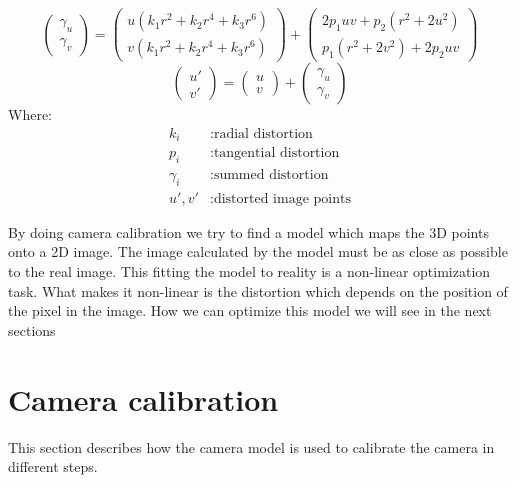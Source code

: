 \documentclass[11pt,a4paper,titlepage,oneside]{report}
\begin{document}
\begin{equation}\label{eq:dist}
	\begin{pmatrix}\gamma_{u} \\
	  \gamma_{v}
	\end{pmatrix}=\begin{pmatrix}
	  u(k_1r^2+k_2r^4+k_3r^6)\\
	  v(k_1r^2+k_2r^4+k_3r^6)
	\end{pmatrix}+\begin{pmatrix}
	  2p_1uv+p_2(r^2+2u^2)\\
	  p_1(r^2+2v^2)+2p_2uv
	\end{pmatrix}
\end{equation}
\begin{equation}\label{eq:pdist}
\begin{pmatrix}u'\\v'\end{pmatrix}=\begin{pmatrix}
u\\v\end{pmatrix}+\begin{pmatrix}\gamma_{u}\\\gamma_{v}\end{pmatrix}
\end{equation}
Where:
\begin{align*}
  k_{i}		&: \text{radial distortion}\\
  p_{i}	    	&: \text{tangential distortion}\\
  \gamma_{i}	&: \text{summed distortion}\\
  u',v'		&: \text{distorted image points}
\end{align*}

By doing camera calibration we try to find a model which maps the 3D points onto a 2D image. The image calculated by the model must be as close as possible to the real image. This fitting the model to reality is a non-linear optimization task. What makes it non-linear is the distortion which depends on the position of the pixel in the image. How we can optimize this model we will see in the next sections

\section{Camera calibration}\label{sec:cam_calib}
This section describes how the camera model is used to calibrate the camera in different steps.
\end{document}
